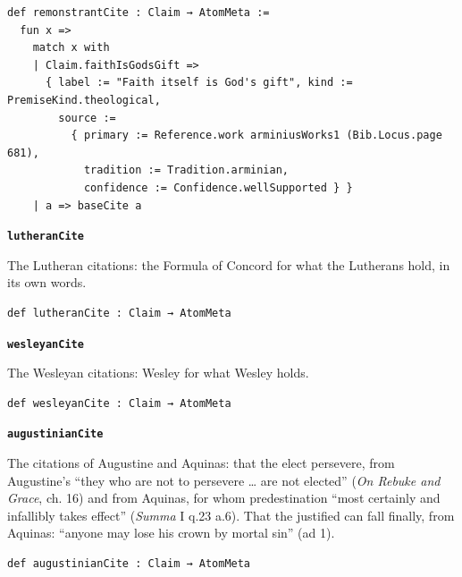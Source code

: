 \documentclass[11pt]{article}
\begin{document}
{\small\begin{verbatim}
def remonstrantCite : Claim → AtomMeta :=
  fun x =>
    match x with
    | Claim.faithIsGodsGift =>
      { label := "Faith itself is God's gift", kind := PremiseKind.theological,
        source :=
          { primary := Reference.work arminiusWorks1 (Bib.Locus.page 681),
            tradition := Tradition.arminian,
            confidence := Confidence.wellSupported } }
    | a => baseCite a
\end{verbatim}}
\par\medskip\noindent\textbf{\texttt{lutheran\allowbreak{}Cite}}\par\nobreak\noindent
The Lutheran citations: the Formula of Concord for what the Lutherans hold, in its own words.

{\small\begin{verbatim}
def lutheranCite : Claim → AtomMeta
\end{verbatim}}
\par\medskip\noindent\textbf{\texttt{wesleyan\allowbreak{}Cite}}\par\nobreak\noindent
The Wesleyan citations: Wesley for what Wesley holds.

{\small\begin{verbatim}
def wesleyanCite : Claim → AtomMeta
\end{verbatim}}
\par\medskip\noindent\textbf{\texttt{augustinian\allowbreak{}Cite}}\par\nobreak\noindent
The citations of Augustine and Aquinas: that the elect persevere, from Augustine’s “they who are not to persevere … are not elected” (\emph{On Rebuke and Grace}, ch. 16) and from Aquinas, for whom predestination “most certainly and infallibly takes effect” (\emph{Summa} I q.23 a.6). That the justified can fall finally, from Aquinas: “anyone may lose his crown by mortal sin” (ad 1).

{\small\begin{verbatim}
def augustinianCite : Claim → AtomMeta
\end{verbatim}}



\end{document}
